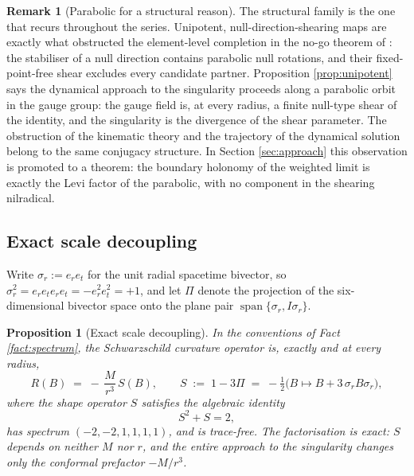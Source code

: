 \documentclass[11pt]{article}
\newtheorem{proposition}[theorem]{Proposition}
\theoremstyle{definition}
\newtheorem{remark}[theorem]{Remark}
\newcommand{\er}{e_r}
\newcommand{\et}{e_t}
\begin{document}
\begin{remark}[Parabolic for a structural reason]\label{rem:parabolic}
The structural family is the one that recurs throughout the series. Unipotent, null-direction-shearing maps are exactly what obstructed the element-level completion in the no-go theorem of \cite[Thm.~4.2]{ButlerT1}: the stabiliser of a null direction contains parabolic null rotations, and their fixed-point-free shear excludes every candidate partner. Proposition \ref{prop:unipotent} says the dynamical approach to the singularity proceeds along a parabolic orbit in the gauge group: the gauge field is, at every radius, a finite null-type shear of the identity, and the singularity is the divergence of the shear parameter. The obstruction of the kinematic theory and the trajectory of the dynamical solution belong to the same conjugacy structure. In Section \ref{sec:approach} this observation is promoted to a theorem: the boundary holonomy of the weighted limit is exactly the Levi factor of the parabolic, with no component in the shearing nilradical.
\end{remark}

\subsection{Exact scale decoupling}\label{subsec:shape}

Write $\sigma_r := \er\et$ for the unit radial spacetime bivector, so $\sigma_r^2 = \er\et\er\et = -\er^2\et^2 = +1$, and let $\Pi$ denote the projection of the six-dimensional bivector space onto the plane pair $\operatorname{span}\{\sigma_r, I\sigma_r\}$.

\begin{proposition}[Exact scale decoupling]\label{prop:shape}
In the conventions of Fact \ref{fact:spectrum}, the Schwarzschild curvature operator is, exactly and at every radius,
\[
R(B) \;=\; -\,\frac{M}{r^3}\,S(B), \qquad
S \;:=\; 1 - 3\Pi \;=\; -\tfrac12\bigl(B \mapsto B + 3\,\sigma_r B \sigma_r\bigr),
\]
where the shape operator $S$ satisfies the algebraic identity
\[
S^2 + S = 2 ,
\]
has spectrum $(-2, -2, 1, 1, 1, 1)$, and is trace-free. The factorisation is exact: $S$ depends on neither $M$ nor $r$, and the entire approach to the singularity changes only the conformal prefactor $-M/r^3$.
\end{proposition}
\end{document}
